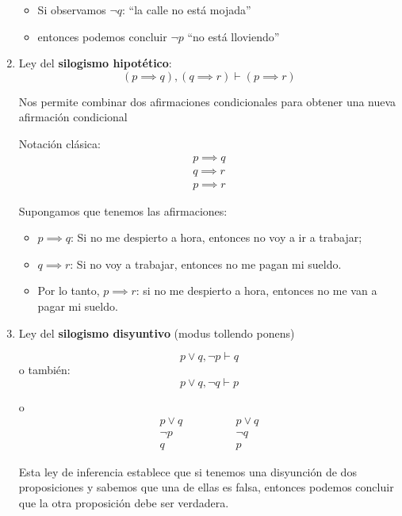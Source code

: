 \begin{enumerate}[label=\alph*)]
\begin{fmd-example}
		\begin{itemize}
			\item Si observamos $\neg q$: ``la calle no está mojada''
			\item entonces podemos concluir $\neg p$ ``no está lloviendo''
		\end{itemize}
	\end{fmd-example}
	
	\item Ley del \textbf{silogismo hipotético}: 
	\[ (p \implies q), (q \implies r) \vdash \left( p \implies r \right)  \]
	
	Nos permite combinar dos afirmaciones condicionales para obtener una nueva afirmación condicional
	
	Notación clásica:
	\[
	\begin{array}{l}
		p  \implies q\\
		q \implies r \\ \hline
		p \implies r
	\end{array}
	\]
	\begin{fmd-example}
		Supongamos que tenemos las afirmaciones:
		\begin{itemize}
			\item $p \implies q$: Si no me despierto a hora, entonces no voy a ir a trabajar;
			\item $q \implies r$: Si no voy a trabajar, entonces no me pagan mi sueldo.
			\item Por lo tanto, $p \implies r$: si no me despierto a hora, entonces no me van a pagar mi sueldo.
		\end{itemize}
	\end{fmd-example}
	
	\item Ley del \textbf{silogismo disyuntivo} (modus tollendo ponens)
	
	\[ p \lor q, \neg p \vdash q \]
	o también:
	\[ p \lor q, \neg q \vdash p \]
	
	o
	\[
	\begin{array}{l}
		p  \lor q\\
		\neg p \\ \hline
		q
	\end{array} \qquad \qquad \begin{array}{l}
	p  \lor q\\
	\neg q \\ \hline
	p
	\end{array}
	\]
	
	Esta ley de inferencia establece que si tenemos una disyunción de dos proposiciones y sabemos que una de ellas es falsa, entonces podemos concluir que la otra proposición debe ser verdadera.
	

\end{enumerate}
